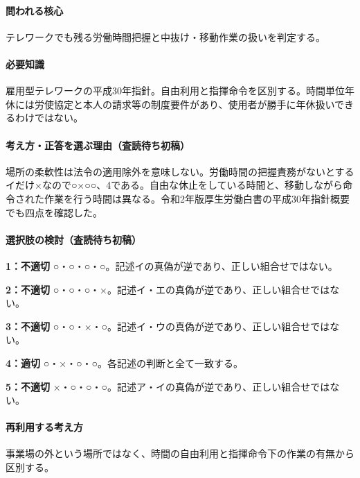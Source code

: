 \paragraph{問われる核心} テレワークでも残る労働時間把握と中抜け・移動作業の扱いを判定する。

\paragraph{必要知識} 雇用型テレワークの平成30年指針。自由利用と指揮命令を区別する。時間単位年休には労使協定と本人の請求等の制度要件があり、使用者が勝手に年休扱いできるわけではない。

\paragraph{考え方・正答を選ぶ理由（査読待ち初稿）} 場所の柔軟性は法令の適用除外を意味しない。労働時間の把握責務がないとするイだけ×なので○×○○、4である。自由な休止をしている時間と、移動しながら命令された作業を行う時間は異なる。令和2年版厚生労働白書の平成30年指針概要でも四点を確認した。

\paragraph{選択肢の検討（査読待ち初稿）}\mbox{}\par

\noindent\textbf{1：不適切} ○・○・○・○。記述イの真偽が逆であり、正しい組合せではない。\par

\noindent\textbf{2：不適切} ○・○・○・×。記述イ・エの真偽が逆であり、正しい組合せではない。\par

\noindent\textbf{3：不適切} ○・○・×・○。記述イ・ウの真偽が逆であり、正しい組合せではない。\par

\noindent\textbf{4：適切} ○・×・○・○。各記述の判断と全て一致する。\par

\noindent\textbf{5：不適切} ×・○・○・○。記述ア・イの真偽が逆であり、正しい組合せではない。\par

\paragraph{再利用する考え方} 事業場の外という場所ではなく、時間の自由利用と指揮命令下の作業の有無から区別する。

